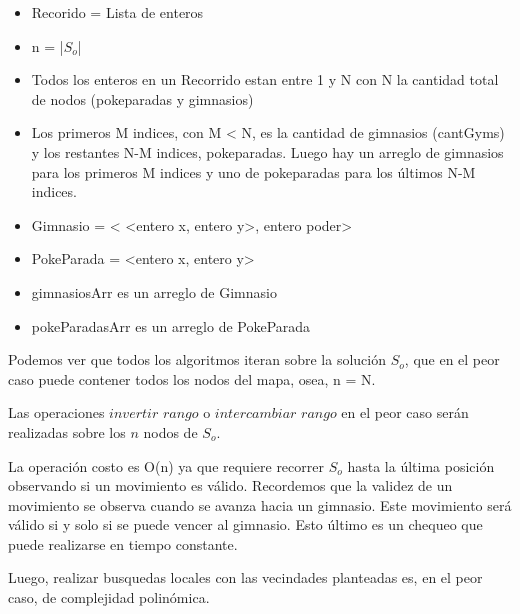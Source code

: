 \begin{algorithm}[H]


\end{algorithm}

\begin{itemize}
\item Recorido = Lista de enteros
\item n = |$S_o$|
\item Todos los enteros en un Recorrido estan entre 1 y N con N la cantidad total de nodos (pokeparadas y gimnasios)
\item Los primeros M indices, con M < N, es la cantidad de gimnasios (cantGyms) y los restantes N-M indices,  pokeparadas. Luego hay un arreglo de gimnasios para los primeros M indices y uno de pokeparadas para los últimos N-M indices.
\item Gimnasio = < <entero x, entero y>, entero poder>
\item PokeParada = <entero x, entero y>
\item gimnasiosArr es un arreglo de Gimnasio
\item pokeParadasArr es un arreglo de PokeParada
\end{itemize}

Podemos ver que todos los algoritmos iteran sobre la solución $S_o$, que en el peor caso puede contener todos los nodos del mapa, osea, n = N.

Las operaciones $invertir$ $rango$ o $intercambiar$ $rango$ en el peor caso serán realizadas sobre los $n$ nodos de $S_o$.

La operación costo es O(n) ya que requiere recorrer $S_o$ hasta la última posición observando si un movimiento es válido. Recordemos que la validez de un movimiento se observa cuando se avanza hacia un gimnasio. Este movimiento será válido si y solo si se puede vencer al gimnasio. Esto último es un chequeo que puede realizarse en tiempo constante.  

Luego, realizar busquedas locales con las vecindades planteadas es, en el peor caso, de complejidad polinómica. 


